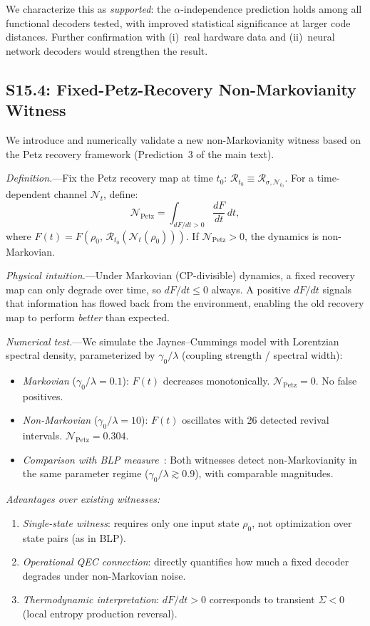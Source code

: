 \documentclass[prl,twocolumn,superscriptaddress,longbibliography]{revtex4-2}
\newcommand{\Petz}{\mathcal{R}}
\newcommand{\chan}{\mathcal{N}}
\begin{document}
We characterize this as \emph{supported}: the $\alpha$-independence
prediction holds among all functional decoders tested, with
improved statistical significance at larger code distances.
Further confirmation with (i)~real hardware data and (ii)~neural
network decoders would strengthen the result.

\subsection{S15.4: Fixed-Petz-Recovery Non-Markovianity Witness}

We introduce and numerically validate a new non-Markovianity witness
based on the Petz recovery framework (Prediction~3 of the main text).

\emph{Definition.}---Fix the Petz recovery map at time $t_0$:
$\Petz_{t_0} \equiv \Petz_{\sigma, \chan_{t_0}}$. For a
time-dependent channel $\chan_t$, define:
\begin{equation}
\mathcal{N}_{\text{Petz}}
= \int_{dF/dt > 0} \frac{dF}{dt}\, dt,
\end{equation}
where $F(t) = F(\rho_0,\, \Petz_{t_0}(\chan_t(\rho_0)))$.
If $\mathcal{N}_{\text{Petz}} > 0$, the dynamics is non-Markovian.

\emph{Physical intuition.}---Under Markovian (CP-divisible) dynamics,
a fixed recovery map can only degrade over time, so $dF/dt \leq 0$
always. A positive $dF/dt$ signals that information has flowed back
from the environment, enabling the old recovery map to perform
\emph{better} than expected.

\emph{Numerical test.}---We simulate the Jaynes--Cummings model with
Lorentzian spectral density, parameterized by $\gamma_0/\lambda$
(coupling strength / spectral width):
\begin{itemize}
\item \emph{Markovian} ($\gamma_0/\lambda = 0.1$): $F(t)$ decreases
  monotonically. $\mathcal{N}_{\text{Petz}} = 0$. No false positives.
\item \emph{Non-Markovian} ($\gamma_0/\lambda = 10$): $F(t)$
  oscillates with 26 detected revival intervals.
  $\mathcal{N}_{\text{Petz}} = 0.304$.
\item \emph{Comparison with BLP measure}~\cite{Breuer2016}: Both
  witnesses detect non-Markovianity in the same parameter regime
  ($\gamma_0/\lambda \gtrsim 0.9$), with comparable magnitudes.
\end{itemize}

\emph{Advantages over existing witnesses:}
\begin{enumerate}
\item \emph{Single-state witness}: requires only one input state
  $\rho_0$, not optimization over state pairs (as in BLP).
\item \emph{Operational QEC connection}: directly quantifies how much
  a fixed decoder degrades under non-Markovian noise.
\item \emph{Thermodynamic interpretation}: $dF/dt > 0$ corresponds to
  transient $\Sigma < 0$ (local entropy production reversal).
\end{enumerate}
\end{document}
